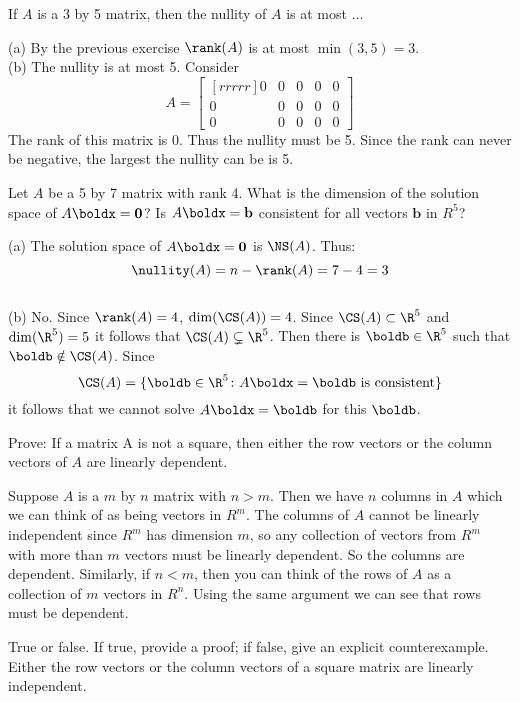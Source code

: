 \ii If $A$ is a 3 by 5 matrix, then the nullity of $A$ is at most $\dots$
\ee
\begin{solution}
\noindent
(a) By the previous exercise  $\rank(A)$ is at most $\min(3,5) = 3$. 
\\
(b) 
The nullity is at most 5. Consider
$$A =
\begin{bmatrix}[rrrrr]
0&0&0&0&0\\
0&0&0&0&0\\
0&0&0&0&0
\end{bmatrix}
$$
The rank of this matrix is 0. Thus the nullity must be 5. Since the rank can never be negative, the largest the nullity can be is 5.
\end{solution}
\ii Let $A$ be a 5 by 7 matrix with rank 4.
\bb
\ii What is the dimension of the solution space of $A\boldx = \textbf{0}$?
\ii Is $A\boldx = \textbf{b}$ consistent for all vectors $\textbf{b}$ in $R^5$?
\ee
\begin{solution}
\noindent (a) The solution space of $A\boldx = \textbf{0}$ is $\NS(A)$. Thus:
$$
\nullity(A) =n- \rank(A) = 7 - 4 = 3
$$
\\
(b) No. Since $\rank(A)=4$, $\dim(\CS(A))=4$. Since $\CS(A)\subset\R^5$ and $\dim(\R^5)=5$ it follows that $\CS(A)\subsetneq \R^5$. Then there is $\boldb\in\R^5$ such that $\boldb\notin\CS(A)$. Since 
\[
\CS(A)=\{\boldb\in\R^5\colon A\boldx=\boldb \text{ is consistent}\}
\]
it follows that we cannot solve $A\boldx=\boldb$ for this $\boldb$. 
\end{solution}
\ii \label{ex:rowscolumns} Prove: If a matrix A is not a square, then either the row vectors or the column vectors of $A$ are linearly dependent.
\\
\begin{solution}
\noindent Suppose $A$ is a $m$ by $n$ matrix with $n>m$. Then we have $n$ columns in $A$ which we can think of as being vectors in $R^m$. The columns of $A$ cannot be linearly independent since $R^m$ has dimension $m$, so any collection of vectors from $R^m$ with more than $m$ vectors must be linearly dependent. So the columns are dependent. Similarly, if $n<m$, then you can think of the rows of $A$ as a collection of $m$ vectors in $R^n$. Using the same argument we can see that rows must be dependent.
\end{solution}
\ii True or false. If true, provide a proof; if false, give an explicit counterexample. 
\bb
\ii Either the row vectors or the column vectors of a square matrix are linearly independent.

